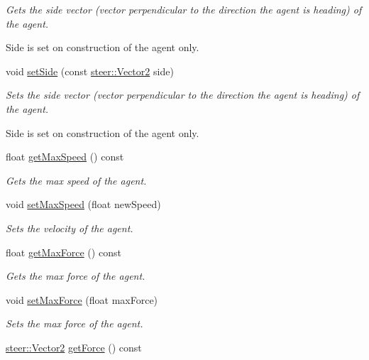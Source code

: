 \begin{DoxyCompactItemize}
\begin{DoxyCompactList}\small\item\em Gets the side vector (vector perpendicular to the direction the agent is heading) of the agent. \par
Side is set on construction of the agent only. \end{DoxyCompactList}\item 
void \hyperlink{classsteer_1_1_agent_a4234075d2bb4f6badf69e6eb15241c29}{set\-Side} (const \hyperlink{structsteer_1_1_vector2}{steer\-::\-Vector2} side)
\begin{DoxyCompactList}\small\item\em Sets the side vector (vector perpendicular to the direction the agent is heading) of the agent. \par
Side is set on construction of the agent only. \end{DoxyCompactList}\item 
\hypertarget{classsteer_1_1_agent_a2402cdb0283eae61629524fbcbd5db44}{float \hyperlink{classsteer_1_1_agent_a2402cdb0283eae61629524fbcbd5db44}{get\-Max\-Speed} () const }\label{classsteer_1_1_agent_a2402cdb0283eae61629524fbcbd5db44}

\begin{DoxyCompactList}\small\item\em Gets the max speed of the agent. \end{DoxyCompactList}\item 
void \hyperlink{classsteer_1_1_agent_a992d6071878af809aca1a8e1891d3ed0}{set\-Max\-Speed} (float new\-Speed)
\begin{DoxyCompactList}\small\item\em Sets the velocity of the agent. \end{DoxyCompactList}\item 
\hypertarget{classsteer_1_1_agent_aac77897a0ef9b553971a497019e6c86f}{float \hyperlink{classsteer_1_1_agent_aac77897a0ef9b553971a497019e6c86f}{get\-Max\-Force} () const }\label{classsteer_1_1_agent_aac77897a0ef9b553971a497019e6c86f}

\begin{DoxyCompactList}\small\item\em Gets the max force of the agent. \end{DoxyCompactList}\item 
void \hyperlink{classsteer_1_1_agent_aca5abda307346947bb8d3ac7817882b2}{set\-Max\-Force} (float max\-Force)
\begin{DoxyCompactList}\small\item\em Sets the max force of the agent. \end{DoxyCompactList}\item 
\hypertarget{classsteer_1_1_agent_a6ea6a0aacce16706f3ccc17c233a5a6d}{\hyperlink{structsteer_1_1_vector2}{steer\-::\-Vector2} \hyperlink{classsteer_1_1_agent_a6ea6a0aacce16706f3ccc17c233a5a6d}{get\-Force} () const }\label{classsteer_1_1_agent_a6ea6a0aacce16706f3ccc17c233a5a6d}


\end{DoxyCompactItemize}
